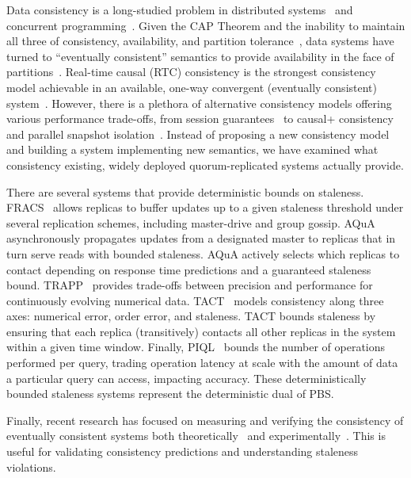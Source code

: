 \documentclass{vldb}
\begin{document}
Data consistency is a long-studied problem in distributed
systems~\cite{consistency-partitioned, danger-rep} and concurrent
programming~\cite{linearizability}.  Given the CAP Theorem and the
inability to maintain all three of consistency, availability, and
partition tolerance~\cite{cap-proof}, data systems have turned to
``eventually consistent'' semantics to provide availability in the
face of partitions~\cite{consistency-partitioning, vogels-defs}.
Real-time causal (RTC) consistency is the strongest consistency model
achievable in an available, one-way convergent (eventually consistent)
system~\cite{rtc-proof}. However, there is a plethora of alternative
consistency models offering various performance trade-offs, from
session guarantees~\cite{sessionguarantees} to causal+
consistency~\cite{cops} and parallel snapshot isolation~\cite{walter}.
Instead of proposing a new consistency model and building a system
implementing new semantics, we have examined what consistency
existing, widely deployed quorum-replicated systems actually provide.

There are several systems that provide deterministic bounds on
staleness.  FRACS~\cite{frac} allows replicas to buffer updates up to
a given staleness threshold under several replication schemes,
including master-drive and group gossip.  AQuA~\cite{aqua}
asynchronously propagates updates from a designated master to replicas
that in turn serve reads with bounded staleness.  AQuA actively
selects which replicas to contact depending on response time
predictions and a guaranteed staleness bound.  TRAPP~\cite{trapp}
provides trade-offs between precision and performance for continuously
evolving numerical data.  TACT~\cite{vahdat-article, vahdat-bounded}
models consistency along three axes: numerical error, order error, and
staleness.  TACT bounds staleness by ensuring that each replica
(transitively) contacts all other replicas in the system within a
given time window.  Finally, PIQL~\cite{piql} bounds the number of
operations performed per query, trading operation latency at scale
with the amount of data a particular query can access, impacting
accuracy. These deterministically bounded staleness systems represent
the deterministic dual of PBS.

Finally, recent research has focused on measuring and verifying the
consistency of eventually consistent systems both theoretically~\cite{podc-hpl} and
experimentally~\cite{measure-consistency, consistency-cidr}. This is useful for validating
consistency predictions and understanding staleness violations.
\end{document}

